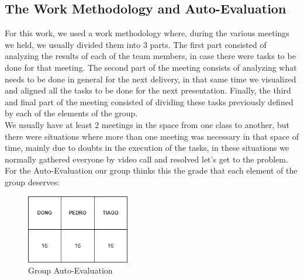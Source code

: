 \newpage

\subsection{The Work Methodology and Auto-Evaluation}

\quad For this work, we used a work methodology where, during the various meetings we held, we usually divided them into 3 parts. The first part consisted of analyzing the results of each of the team members, in case there were tasks to be done for that meeting. The second part of the meeting consists of analyzing what needs to be done in general for the next delivery, in that same time we visualized and aligned all the tasks to be done for the next presentation. Finally, the third and final part of the meeting consisted of dividing these tasks previously defined by each of the elements of the group.\\

We usually have at least 2 meetings in the space from one class to another, but there were situations where more than one meeting was necessary in that space of time, mainly due to doubts in the execution of the tasks, in these situations we normally gathered everyone by video call and resolved let's get to the problem. \\

For the Auto-Evaluation our group thinks this the grade that each element of the group deserves:
\\
\begin{figure}[H]
    \centering
    \includegraphics[width=0.4\textwidth]{assets/notas.png}
    \caption{Group Auto-Evaluation}
    \label{fig:notas}
    \end{figure}